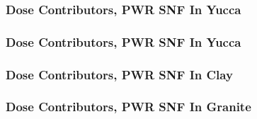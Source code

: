 
\begin{frame}[ctb!]
  \frametitle{Dose Contributors, PWR SNF In Yucca}
\footnotesize{
  
}
\end{frame}

\begin{frame}[ctb!]
  \frametitle{Dose Contributors, PWR SNF In Yucca}
\footnotesize{
  
}
\end{frame}

\begin{frame}[ctb!]
  \frametitle{Dose Contributors, PWR SNF In Clay}
\footnotesize{
  
}
\end{frame}

\begin{frame}[ctb!]
  \frametitle{Dose Contributors, PWR SNF In Granite}
\footnotesize{
  
}
\end{frame}

